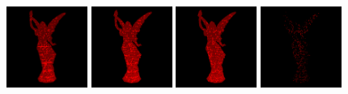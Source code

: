 \begin{figure}[!htbp]
  \centering
  \includegraphics[height=100px]{images/graphics/overdraw-lucy1-nocull.png}
  \includegraphics[height=100px]{images/graphics/overdraw-lucy1-pooc.png}
  \includegraphics[height=100px]{images/graphics/overdraw-lucy1-pmoc.png}
  \includegraphics[height=100px]{images/graphics/overdraw-lucy1-diff.png}


\end{figure}
